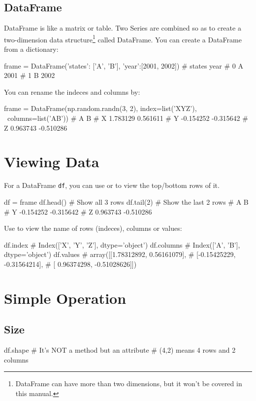 \documentclass{report}
\begin{document}
\subsection{DataFrame}
DataFrame is like a matrix or table. Two Series are combined so as to create a two-dimension data structure\footnote{DataFrame can have more than two dimensions, but it won't be covered in this manual.} called DataFrame. You can create a DataFrame from a dictionary:
\begin{py}
frame = DataFrame({'states': ['A', 'B'], 'year':[2001, 2002]})
#   states  year
# 0      A  2001
# 1      B  2002
\end{py}

You can rename the indeces and columns by:
\begin{py}
frame = DataFrame(np.random.randn(3, 2), index=list('XYZ'),　\ 
        columns=list('AB'))
#           A         B
# X  1.783129  0.561611
# Y -0.154252 -0.315642
# Z  0.963743 -0.510286
\end{py}

\section{Viewing Data}
For a DataFrame \texttt{df}, you can use  or  to view the top/bottom rows of it. 
\begin{py}
df = frame
df.head()  # Show all 3 rows
df.tail(2) # Show the last 2 rows
#           A         B
# Y -0.154252 -0.315642
# Z  0.963743 -0.510286
\end{py}

Use  to view the name of rows (indeces), columns or values:
\begin{py}
df.index
# Index(['X', 'Y', 'Z'], dtype='object')
df.columns
# Index(['A', 'B'], dtype='object')
df.values
# array([[1.78312892,  0.56161079],
#       [-0.15425229, -0.31564214],
#       [ 0.96374298, -0.51028626]])
\end{py}

\section{Simple Operation}
\subsection{Size}
\begin{py}
df.shape  # It's NOT a method but an attribute
#  (4,2) means 4 rows and 2 columns
\end{py}
\end{document}
